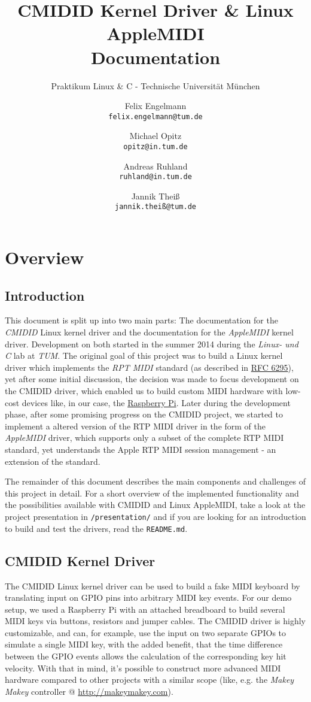 \documentclass[paper=a4,fontsize=11pt,twocolumn,pagesize,bibtotoc]{scrartcl}
\title{CMIDID Kernel Driver \& Linux AppleMIDI\\Documentation}
\subtitle{Praktikum Linux \& C - Technische Universität München}
\author{
Felix Engelmann\\ \texttt{felix.engelmann@tum.de}
\and
Michael Opitz\\ \texttt{opitz@in.tum.de}
\and
Andreas Ruhland\\ \texttt{ruhland@in.tum.de}
\and
Jannik Theiß\\ \texttt{jannik.theiß@tum.de}
}
\begin{document}
\maketitle

\section{Overview}
\label{documentation:overview}

\subsection{Introduction}
\label{overview:intro}

This document is split up into two main parts: The documentation for the 
\emph{CMIDID} Linux kernel driver and the documentation for the 
\emph{AppleMIDI} kernel driver. Development on both started in the summer 
2014 during the \emph{Linux- und C} lab at \emph{TUM}. The original 
goal of this project was to build a Linux kernel driver which implements 
the \emph{RPT MIDI} standard (as described in 
\href{http://tools.ietf.org/html/rfc6295}{RFC 6295}), yet after some initial 
discussion, the decision was made to focus development on the CMIDID driver, 
which enabled us to build custom MIDI hardware with low-cost devices like, in 
our case, the \href{www.raspberrypi.org}{Raspberry Pi}. Later during the 
development phase, after some promising progress on the CMIDID project, we 
started to implement a altered version of the RTP MIDI driver in the 
form of the \emph{AppleMIDI} driver, which supports only a subset of the 
complete RTP MIDI standard, yet understands the Apple RTP MIDI session 
management - an extension of the standard.

The remainder of this document describes the main components and challenges 
of this project in detail. For a short overview of the implemented 
functionality and the possibilities available with CMIDID and Linux AppleMIDI, 
take a look at the project presentation in \texttt{/presentation/} and if 
you are looking for an introduction to build and test the drivers, read the 
\texttt{README.md}.

\subsection{CMIDID Kernel Driver}
\label{overview:cmidid}

The CMIDID Linux kernel driver can be used to build a fake MIDI keyboard 
by translating input on GPIO pins into arbitrary MIDI key events. For our 
demo setup, we used a Raspberry Pi with an attached breadboard to build
several MIDI keys via buttons, resistors and jumper cables. The CMIDID driver 
is highly customizable, and can, for example, use the input on two separate 
GPIOs to simulate a single MIDI key, with the added benefit, that the time 
difference between the GPIO events allows the calculation of the corresponding 
key hit velocity. With that in mind, it's possible to construct more advanced 
MIDI hardware compared to other projects with a similar scope (like, e.g. the 
\emph{Makey Makey} controller @ \url{http://makeymakey.com}).
\end{document}
